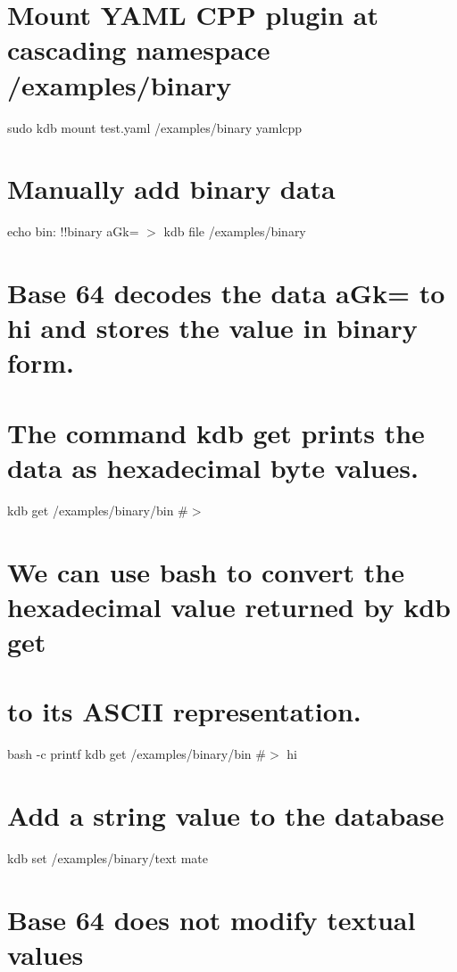  \section*{Mount Y\+A\+ML C\+PP plugin at cascading namespace {\ttfamily /examples/binary}}

sudo kdb mount test.\+yaml /examples/binary yamlcpp \section*{Manually add binary data}

echo \textquotesingle{}bin\+: !!binary a\+Gk=\textquotesingle{} $>$ {\ttfamily kdb file /examples/binary}

\section*{Base 64 decodes the data {\ttfamily a\+Gk=} to {\ttfamily hi} and stores the value in binary form.}

\section*{The command {\ttfamily kdb get} prints the data as hexadecimal byte values.}

kdb get /examples/binary/bin \#$>$ 

\section*{We can use {\ttfamily bash} to convert the hexadecimal value returned by {\ttfamily kdb get}}

\section*{to its A\+S\+C\+II representation.}

bash -\/c \textquotesingle{}printf {\ttfamily kdb get /examples/binary/bin}\textquotesingle{} \#$>$ hi

\section*{Add a string value to the database}

kdb set /examples/binary/text mate \section*{Base 64 does not modify textual values}

